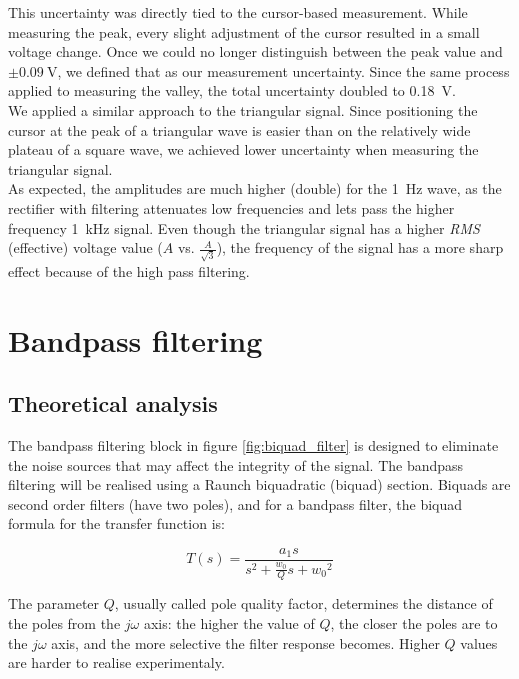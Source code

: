 \documentclass[lettersize,journal]{IEEEtran}
\begin{document}
This uncertainty was directly tied to the cursor-based measurement. While measuring the peak, every slight adjustment of the cursor resulted in a small voltage change. Once we could no longer distinguish between the peak value and $\pm \SI{0.09}{\volt}$, we defined that as our measurement uncertainty. Since the same process applied to measuring the valley, the total uncertainty doubled to \SI{0.18}{\volt}.\\

We applied a similar approach to the triangular signal. Since positioning the cursor at the peak of a triangular wave is easier than on the relatively wide plateau of a square wave, we achieved lower uncertainty when measuring the triangular signal.\\

As expected, the amplitudes are much higher (double) for the \SI{1}{\hertz} wave, as the rectifier with filtering attenuates low frequencies and lets pass the higher frequency \SI{1}{\kilo \hertz} signal. Even though the triangular signal has a higher \textit{RMS} (effective) voltage value ($A$ vs. $\frac{A}{\sqrt{3}}$), the frequency of the signal has a more sharp effect because of the high pass filtering.

\section{Bandpass filtering}
\subsection{Theoretical analysis}
The bandpass filtering block in figure \ref{fig:biquad_filter} is designed to eliminate the noise sources that may affect the integrity of the signal.
The bandpass filtering will be realised using a Raunch biquadratic (biquad) section. Biquads are second order filters (have two poles), and for a bandpass filter, the biquad formula for the transfer function is:

\begin{equation}
    T(s) = \frac{a_1 s}{s^2 + \frac{w_0}{Q}s + {w_0}^2}
\end{equation}

The parameter $Q$, usually called pole quality factor, determines the distance of the poles from the $j\omega$ axis: the higher the value of $Q$, the closer the poles are to the $j\omega$ axis, and the more selective the filter response becomes. Higher $Q$ values are harder to realise experimentaly.\\
\end{document}
